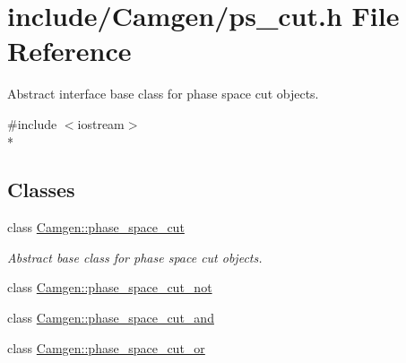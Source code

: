 \hypertarget{a00713}{\section{include/\-Camgen/ps\-\_\-cut.h File Reference}
\label{a00713}
}


Abstract interface base class for phase space cut objects.  


{\ttfamily \#include $<$iostream$>$}\\*
\subsection*{Classes}
\begin{DoxyCompactItemize}
\item 
class \hyperlink{a00413}{Camgen\-::phase\-\_\-space\-\_\-cut}
\begin{DoxyCompactList}\small\item\em Abstract base class for phase space cut objects. \end{DoxyCompactList}\item 
class \hyperlink{a00415}{Camgen\-::phase\-\_\-space\-\_\-cut\-\_\-not}
\item 
class \hyperlink{a00414}{Camgen\-::phase\-\_\-space\-\_\-cut\-\_\-and}
\item 
class \hyperlink{a00416}{Camgen\-::phase\-\_\-space\-\_\-cut\-\_\-or}
\end{DoxyCompactItemize}
